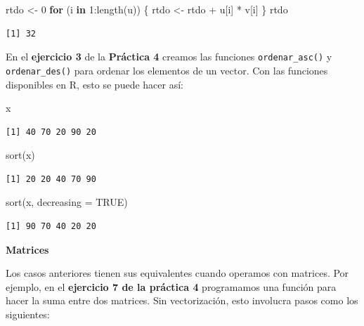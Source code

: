 \documentclass[
]{book}
\newenvironment{Shaded}{\begin{snugshade}}{\end{snugshade}}
\newcommand{\AttributeTok}[1]{\textcolor[rgb]{0.77,0.63,0.00}{#1}}
\newcommand{\ConstantTok}[1]{\textcolor[rgb]{0.00,0.00,0.00}{#1}}
\newcommand{\ControlFlowTok}[1]{\textcolor[rgb]{0.13,0.29,0.53}{\textbf{#1}}}
\newcommand{\DecValTok}[1]{\textcolor[rgb]{0.00,0.00,0.81}{#1}}
\newcommand{\FunctionTok}[1]{\textcolor[rgb]{0.00,0.00,0.00}{#1}}
\newcommand{\NormalTok}[1]{#1}
\newcommand{\OtherTok}[1]{\textcolor[rgb]{0.56,0.35,0.01}{#1}}
\newcommand{\SpecialCharTok}[1]{\textcolor[rgb]{0.00,0.00,0.00}{#1}}
\begin{document}
\begin{Shaded}
\begin{Highlighting}[]
\NormalTok{rtdo }\OtherTok{\textless{}{-}} \DecValTok{0}
\ControlFlowTok{for}\NormalTok{ (i }\ControlFlowTok{in} \DecValTok{1}\SpecialCharTok{:}\FunctionTok{length}\NormalTok{(u)) \{ }
\NormalTok{    rtdo }\OtherTok{\textless{}{-}}\NormalTok{ rtdo }\SpecialCharTok{+}\NormalTok{ u[i] }\SpecialCharTok{*}\NormalTok{ v[i]}
\NormalTok{\}}
\NormalTok{rtdo}
\end{Highlighting}
\end{Shaded}

\begin{verbatim}
[1] 32
\end{verbatim}

En el \textbf{ejercicio 3} de la \textbf{Práctica 4} creamos las funciones \texttt{ordenar\_asc()} y \texttt{ordenar\_des()} para ordenar los elementos de un vector. Con las funciones disponibles en R, esto se puede hacer así:

\begin{Shaded}
\begin{Highlighting}[]
\NormalTok{x}
\end{Highlighting}
\end{Shaded}

\begin{verbatim}
[1] 40 70 20 90 20
\end{verbatim}

\begin{Shaded}
\begin{Highlighting}[]
\FunctionTok{sort}\NormalTok{(x)}
\end{Highlighting}
\end{Shaded}

\begin{verbatim}
[1] 20 20 40 70 90
\end{verbatim}

\begin{Shaded}
\begin{Highlighting}[]
\FunctionTok{sort}\NormalTok{(x, }\AttributeTok{decreasing =} \ConstantTok{TRUE}\NormalTok{)}
\end{Highlighting}
\end{Shaded}

\begin{verbatim}
[1] 90 70 40 20 20
\end{verbatim}

\textbf{Matrices}

Los casos anteriores tienen sus equivalentes cuando operamos con matrices. Por ejemplo, en el \textbf{ejercicio 7 de la práctica 4} programamos una función para hacer la suma entre dos matrices. Sin vectorización, esto involucra pasos como los siguientes:
\end{document}
